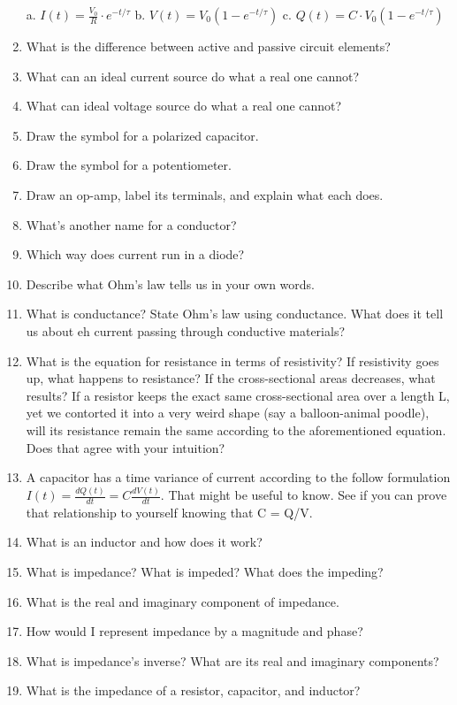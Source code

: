 \documentclass[11pt]{book}
\begin{document}
\begin{enumerate}
	\subitem a. $I(t) = \frac{V_0}{R}\cdot e^{-t/\tau}$
	\subitem b. $V(t) = V_0\left(1-e^{-t/\tau}\right)$
	\subitem c. $Q(t) = C\cdot V_0\left(1-e^{-t/\tau}\right)$
	\item What is the difference between active and passive circuit elements?
	\item What can an ideal current source do what a real one cannot?
	\item What can ideal voltage source do what a real one cannot?
	\item Draw the symbol for a polarized capacitor.
	\item Draw the symbol for a potentiometer.
	\item Draw an op-amp, label its terminals, and explain what each does.
	\item What’s another name for a conductor?
	\item Which way does current run in a diode?
	\item Describe what Ohm’s law tells us in your own words.
	\item What is conductance? State Ohm’s law using conductance. What does it tell us about eh current passing through conductive materials?
	\item What is the equation for resistance in terms of resistivity? If resistivity goes up, what happens to resistance? If the cross-sectional areas decreases, what results? If a resistor keeps the exact same cross-sectional area over a length L, yet we contorted it into a very weird shape (say a balloon-animal poodle), will its resistance remain the same according to the aforementioned equation. Does that agree with your intuition?
	\item A capacitor has a time variance of current according to the follow formulation $I(t) = \frac{dQ(t)}{dt} = C\frac{dV(t)}{dt}$. That might be useful to know. See if you can prove that relationship to yourself knowing that C = Q/V.
	\item What is an inductor and how does it work?
	\item What is impedance? What is impeded? What does the impeding?
	\item What is the real and imaginary component of impedance.	
	\item How would I represent impedance by a magnitude and phase?
	\item 	What is impedance’s inverse? What are its real and imaginary components?	
	\item What is the impedance of a resistor, capacitor, and inductor?

\end{enumerate}
\end{document}
